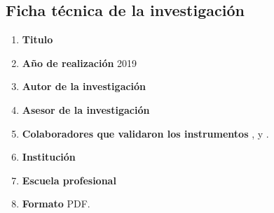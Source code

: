 \documentclass[12pt,a4paper]{article}
\begin{document}
\subsection{Ficha técnica de la investigación \label{ficha tecnica}}
\begin{enumerate}
	\item \textbf{Titulo }\titulo\textbf{ }
	\item \textbf{Año de realización }2019
	\item \textbf{Autor de la investigación }\autor
	\item \textbf{Asesor de la investigación }\asesor
	\item \textbf{Colaboradores que validaron los instrumentos }\asesor, \expert y \expertt.
	\item \textbf{Institución } \lugar
	\item \textbf{Escuela profesional }\lugar
	\item \textbf{Formato }PDF.\textbf{ }


\end{enumerate}
\end{document}
